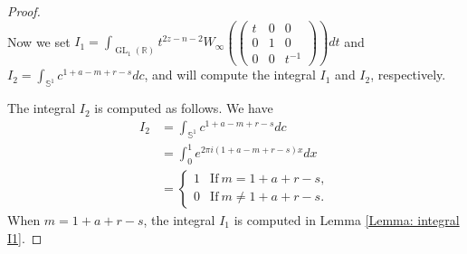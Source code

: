 \documentclass[10pt,a4paper]{amsart}
\DeclareMathOperator{\GL}{\mathrm{GL}}
\def\RR{\mathbb{R}}
\begin{document}
\begin{proof}
\begin{equation*}
    \end{equation*}
    Now we set $I_1 = \int_{\GL_1(\RR)} t^{2z - n - 2} W_{\infty}( \begin{pmatrix}
                                                                        t & 0 & 0 \\
                                                                        0 & 1 & 0 \\
                                                                        0 & 0 & t^{-1} 
                                                                      \end{pmatrix}) dt$ and $I_2 = \int_{\mathbb{S}^{1}} c^{1 + a - m + r - s} dc$, 
    and will compute the integral $I_1$ and $I_2$, respectively. 

    \par The integral $I_2$ is computed as follows. 
         We have 
         \begin{align*}
             I_2 & = \int_{\mathbb{S}^{1}} c^{1 + a - m + r - s} dc \\
                 & = \int_{0}^{1} e^{2\pi{i}(1 + a - m + r - s)x} dx \\
                 & = \begin{cases}
                        1 & \text{If}\ m = 1+ a + r - s, \\
                        0 & \text{If}\ m \neq 1+ a + r - s. 
                     \end{cases}
         \end{align*}
    When $m = 1 + a + r - s$, the integral $I_1$ is computed in Lemma \ref{Lemma: integral I1}. 
    

\end{proof}
\end{document}
